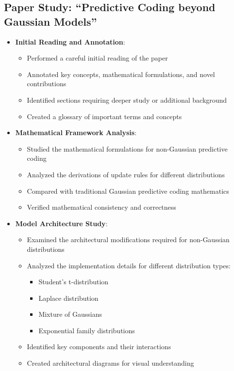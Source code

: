 \documentclass{article}
\begin{document}
\subsection{Paper Study: ``Predictive Coding beyond Gaussian Models''}

\begin{itemize}
  \item \textbf{Initial Reading and Annotation}:
  \begin{itemize}
    \item Performed a careful initial reading of the paper
    \item Annotated key concepts, mathematical formulations, and novel contributions
    \item Identified sections requiring deeper study or additional background
    \item Created a glossary of important terms and concepts
  \end{itemize}

  \item \textbf{Mathematical Framework Analysis}:
  \begin{itemize}
    \item Studied the mathematical formulations for non-Gaussian predictive coding
    \item Analyzed the derivations of update rules for different distributions
    \item Compared with traditional Gaussian predictive coding mathematics
    \item Verified mathematical consistency and correctness
  \end{itemize}

  \item \textbf{Model Architecture Study}:
  \begin{itemize}
    \item Examined the architectural modifications required for non-Gaussian distributions
    \item Analyzed the implementation details for different distribution types:
    \begin{itemize}
      \item Student's t-distribution
      \item Laplace distribution
      \item Mixture of Gaussians
      \item Exponential family distributions
    \end{itemize}
    \item Identified key components and their interactions
    \item Created architectural diagrams for visual understanding
  \end{itemize}


\end{itemize}
\end{document}
